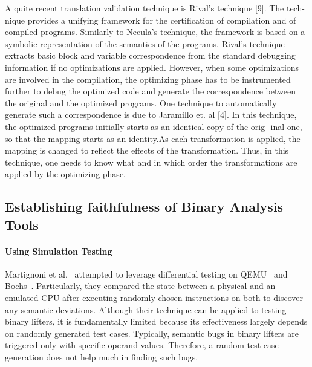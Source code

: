 A quite recent translation validation technique is Rival’s technique [9]. The
tech- nique provides a unifying framework for the certification of compilation
and of compiled programs. Similarly to Necula’s technique, the framework is
based on a symbolic representation of the semantics of the programs. Rival’s
technique extracts basic block and variable correspondence from the standard
debugging information if no optimizations are applied. However, when some
optimizations are involved in the compilation, the optimizing phase has to be
instrumented further to debug the optimized code and generate the
correspondence between the original and the optimized programs. One technique
to automatically generate such a correspondence is due to Jaramillo et. al [4].
In this technique, the optimized programs initially starts as an identical copy
of the orig- inal one, so that the mapping starts as an identity.As each
transformation is applied, the mapping is changed to reflect the effects of the
transformation. Thus, in this technique, one needs to know what and in which
order the transformations are applied by the optimizing phase.  

\subsection{Establishing faithfulness of Binary Analysis Tools}

\paragraph{Using Simulation Testing}

Martignoni et al.~\cite{Martignoni:ISSTA2009, Martignoni:ISSTA2010} attempted
to leverage differential testing on QEMU~\cite{QEMU:USENIX05} and
Bochs~\cite{Bochs1996}. Particularly, they compared the state between a
physical and an emulated CPU after executing randomly chosen instructions on
both to discover any semantic deviations. Although their technique can be
applied to testing binary lifters, it is fundamentally limited because its
effectiveness largely depends on randomly generated test cases. Typically,
              semantic bugs in binary lifters are triggered only with specific
              operand values. Therefore, a random test case generation does not
              help much in finding such bugs.

